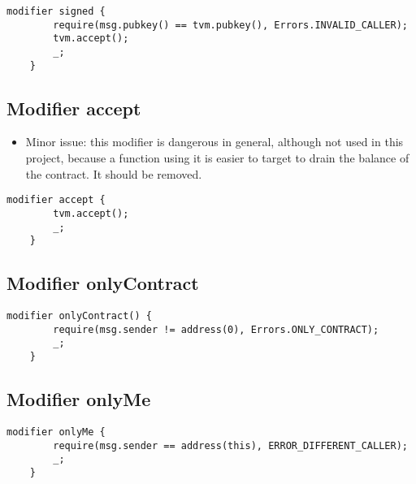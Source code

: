 \begin{lstlisting}[firstnumber=30]
    modifier signed {
        require(msg.pubkey() == tvm.pubkey(), Errors.INVALID_CALLER);
        tvm.accept();
        _;
    }
\end{lstlisting}

\subsection{Modifier accept}

\begin{itemize}
\item Minor issue: this modifier is dangerous in general, although not
  used in this project, because a function using it is easier to
  target to drain the balance of the contract. It should be removed.
\end{itemize}

\begin{lstlisting}[firstnumber=36]
    modifier accept {
        tvm.accept();
        _;
    }
\end{lstlisting}

\subsection{Modifier onlyContract}


\begin{lstlisting}[firstnumber=41]
    modifier onlyContract() {
        require(msg.sender != address(0), Errors.ONLY_CONTRACT);
        _;
    }
\end{lstlisting}

\subsection{Modifier onlyMe}


\begin{lstlisting}[firstnumber=46]
    modifier onlyMe {
        require(msg.sender == address(this), ERROR_DIFFERENT_CALLER);
        _;
    }
\end{lstlisting}
